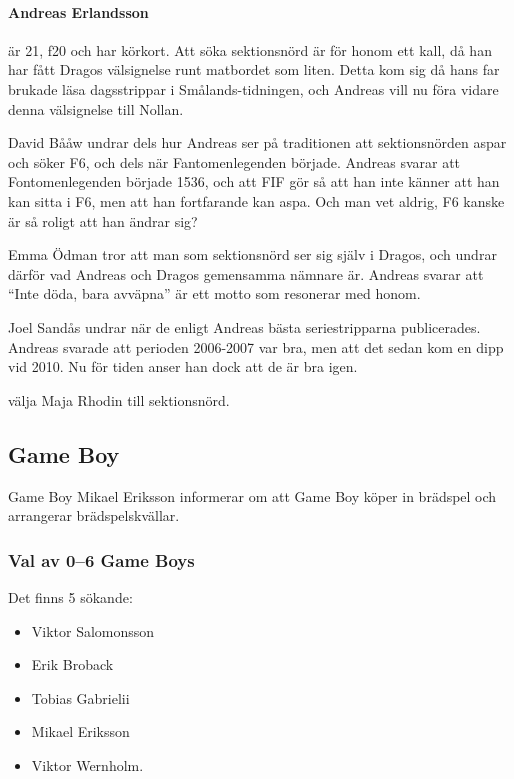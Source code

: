 \documentclass[hidelinks]{sektionsmote}
\begin{document}
\paragraph{Andreas Erlandsson} är 21, f20 och har körkort.
Att söka sektionsnörd är för honom ett kall, då han har fått Dragos välsignelse runt matbordet som liten.
Detta kom sig då hans far brukade läsa dagsstrippar i Smålands-tidningen, och Andreas vill nu föra vidare denna välsignelse till Nollan.

David Bååw undrar dels hur Andreas ser på traditionen att sektionsnörden aspar och söker F6, och dels när Fantomenlegenden började.
Andreas svarar att Fontomenlegenden började 1536, och att FIF gör så att han inte känner att han kan sitta i F6, men att han fortfarande kan aspa.
Och man vet aldrig, F6 kanske är så roligt att han ändrar sig?

Emma Ödman tror att man som sektionsnörd ser sig själv i Dragos, och undrar därför vad Andreas och Dragos gemensamma nämnare är.
Andreas svarar att \enquote{Inte döda, bara avväpna} är ett motto som resonerar med honom.

Joel Sandås undrar när de enligt Andreas bästa seriestripparna publicerades.
Andreas svarade att perioden 2006-2007 var bra, men att det sedan kom en dipp vid 2010.
Nu för tiden anser han dock att de är bra igen.

\begin{beslut}
  \item välja Maja Rhodin till sektionsnörd.
\end{beslut}


\subsection{Game Boy}
Game Boy Mikael Eriksson informerar om att Game Boy köper in brädspel och arrangerar brädspelskvällar.

\subsubsection{Val av 0--6 Game Boys}
Det finns 5 sökande:
\begin{itemize}
    \item Viktor Salomonsson
    \item Erik Broback
    \item Tobias Gabrielii
    \item Mikael Eriksson
    \item Viktor Wernholm.
\end{itemize}
\end{document}

